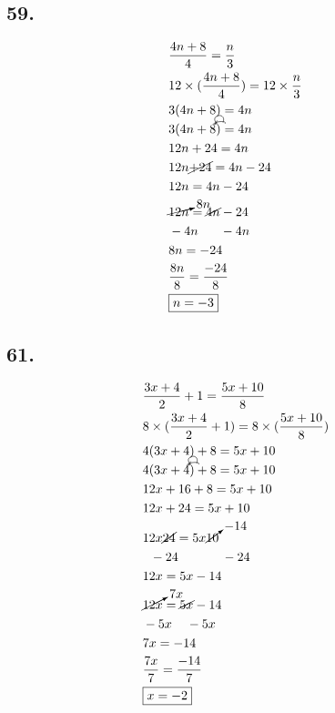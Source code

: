 \documentclass{article}
\newcommand{\tikzmark}[1]{\tikz[overlay,remember picture] \node (#1) {};}
\newcommand{\DrawBox}[2]{%
    \begin{tikzpicture}[overlay,remember picture]
        \draw[->,shorten >=5pt,shorten <=5pt,out=70,in=130,distance=0.5cm,#1] (MarkA.north) to (MarkC.north);
        \draw[->,shorten >=5pt,shorten <=5pt,out=50,in=140,distance=0.3cm,#2] (MarkA.north) to (MarkB.north);
    \end{tikzpicture}
}
\begin{document}
    \subsection*{59.}
    \begin{align*}
        & \frac{4n + 8}{4} = \frac{n}{3}\\
        & 12 \times (\frac{4n + 8}{4}) = 12 \times \frac{n}{3}\\
        & 3(4n + 8) = 4n\\
        & \tikzmark{MarkA}3(4n\tikzmark{MarkB} + 8\tikzmark{MarkC})\DrawBox{black}{black} = 4n \\
        & 12n + 24 = 4n\\
        & 12n \cancel{+ 24} = 4n - 24 \\
        & 12n = 4n - 24\\
        & \cancelto{8n}{12n} = \cancel{4n} -24\\
        & - 4n \hspace{.6cm} -4n \\
        & 8n = -24 \\
        & \frac{8n}{8} = \frac{-24}{8} \\
        & \boxed{n = -3}\\
    \end{align*}


    \subsection*{61.}
    \begin{align*}
        & \frac{3x + 4}{2} + 1 = \frac{5x + 10}{8}\\
        & 8 \times (\frac{3x + 4}{2} + 1) = 8 \times (\frac{5x + 10}{8})\\
        & 4(3x + 4) + 8 = 5x + 10\\
        & \tikzmark{MarkA}4(3x\tikzmark{MarkB} + 4\tikzmark{MarkC})\DrawBox{black}{black} + 8 = 5x + 10  \\
        & 12x + 16 + 8 = 5x + 10\\
        & 12x + 24 = 5x + 10\\
        & 12x \cancel{24} = 5x \cancelto{-14}{10}\\
        & \hspace{.2cm} - 24 \hspace{1.2cm} - 24 \\
        & 12x = 5x -14 \\
        & \cancelto{7x}{12x} = \cancel{5x} - 14 \\
        & - 5x \hspace{.4cm} -5x \\
        & 7x = -14 \\
        & \frac{7x}{7} = \frac{-14}{7} \\
        & \boxed{x = -2}\\
    \end{align*}
\end{document}
